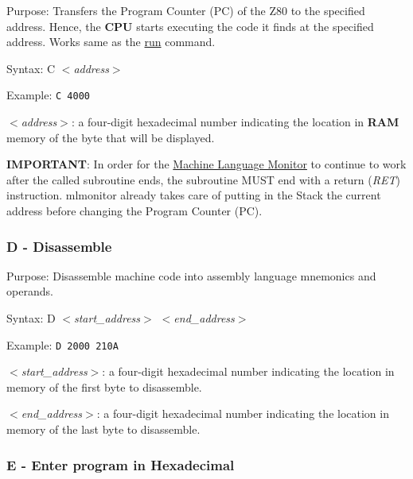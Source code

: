         Purpose: Transfers the Program Counter (PC) of the Z80 to the specified
        address. Hence, the \textbf{CPU} starts executing the code it finds at
        the specified address. Works same as the \hyperref[cmd:run]{run} command.

        Syntax: C \textit{$<$address$>$}

        Example: \texttt{C 4000}

        \hspace{1cm}\textit{$<$address$>$}: a four-digit hexadecimal number
        indicating the location in \textbf{RAM} memory of the byte that will be
        displayed.

        \textbf{IMPORTANT}: In order for the \hyperref[software:mlmonitor]
        {Machine Language Monitor} to continue to work after the called
        subroutine ends, the subroutine MUST end with a return (\textit{RET})
        instruction. mlmonitor already takes care of putting in the Stack the
        current address before changing the Program Counter (PC).

        \subsubsection{D - Disassemble}

        Purpose: Disassemble machine code into assembly language mnemonics and
        operands.

        Syntax: D \textit{$<$start\_address$>$ $<$end\_address$>$}

        Example: \texttt{D 2000 210A}

        \hspace{1cm}\textit{$<$start\_address$>$}: a four-digit hexadecimal
        number indicating the location in memory of the first byte to
        disassemble.

        \hspace{1cm}\textit{$<$end\_address$>$}: a four-digit hexadecimal
        number indicating the location in memory of the last byte to
        disassemble.

        \subsubsection{E - Enter program in Hexadecimal}

